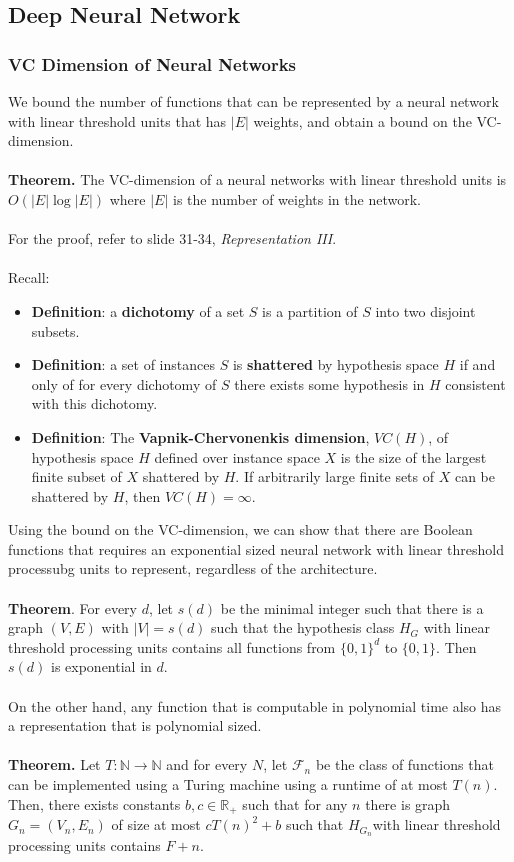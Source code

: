 \documentclass{article}
\begin{document}
   \subsection{Deep Neural Network}
   \subsubsection{VC Dimension of Neural Networks}
   We bound the number of functions that can be represented by a neural network with linear threshold units that has $|E|$ weights, and obtain a bound on the VC-dimension.
   \\\\
   \textbf{Theorem.} The VC-dimension of a neural networks with linear threshold units is $O(|E|\log|E|)$ where $|E|$ is the number of weights in the network.
   \\\\
   For the proof, refer to slide 31-34, \textit{Representation III}.
   \\\\
   Recall:
   \begin{itemize}
   \item \textbf{Definition}: a \textbf{dichotomy} of a set $S$ is a partition of $S$ into two disjoint subsets.
   \item \textbf{Definition}: a set of instances $S$ is \textbf{shattered} by hypothesis space $H$ if and only of for every dichotomy of $S$ there exists some hypothesis in $H$ consistent with this dichotomy.
   \item \textbf{Definition}: The \textbf{Vapnik-Chervonenkis dimension}, $VC(H)$, of hypothesis space $H$ defined over instance space $X$ is the size of the largest finite subset of $X$ shattered by $H$. If arbitrarily large finite sets of $X$ can be shattered by $H$, then $VC(H) = \infty.$
   \end{itemize}
   Using the bound on the VC-dimension, we can show that there are Boolean functions that requires an exponential sized neural network with linear threshold processubg units to represent, regardless of the architecture.
   \\\\
   \textbf{Theorem}. For every $d$, let $s(d)$ be the minimal integer such that there is a graph $(V,E)$ with $|V|=s(d)$ such that the hypothesis class $H_G$ with linear threshold processing units contains all functions from $\{0,1\}^d$ to $\{0,1\}$. Then $s(d)$ is exponential in $d$.
   \\\\
   On the other hand, any function that is computable in polynomial time also has a representation that is polynomial sized.
   \\\\
   \textbf{Theorem.} Let $T:\mathbb{N} \rightarrow \mathbb{N}$ and for every $N$, let $\mathcal{F}_n$ be the class of functions that can be implemented using a Turing machine using a runtime of at most $T(n)$. Then, there exists constants $b,c \in \mathbb{R}_+$ such that for any $n$ there is graph $G_n=(V_n, E_n)$ of size at most $cT(n)^2+b$ such that $H_{G_n} $with linear threshold processing units contains $F+n$.
   
\end{document}
